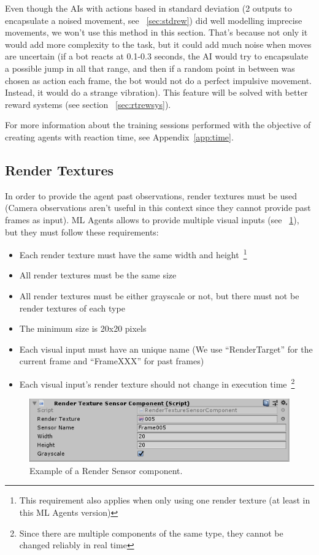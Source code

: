 Even though the AIs with actions based in standard deviation (2 outputs to encapsulate a noised movement, see ~\ref{sec:stdrew}) did well modelling imprecise movements, we won't use this method in this section. That's because not only it would add more complexity to the task, but it could add much noise when moves are uncertain (if a bot reacts at 0.1-0.3 seconds, the AI would try to encapsulate a possible jump in all that range, and then if a random point in between was chosen as action each frame, the bot would not do a perfect impulsive movement. Instead, it would do a strange vibration). This feature will be solved with better reward systems (see section ~\ref{sec:rtrewsys}).

For more information about the training sessions performed with the objective of creating agents with reaction time, see Appendix~\ref{app:time}.

\subsection{Render Textures}

In order to provide the agent past observations, render textures must be used (Camera observations aren't useful in this context since they cannot provide past frames as input). ML Agents allows to provide multiple visual inputs (see ~\ref{fig:rendersens}), but they must follow these requirements:

\begin{itemize}
 \item Each render texture must have the same width and height~\footnote{This requirement also applies when only using one render texture (at least in this ML Agents version)}
 \item All render textures must be the same size
 \item All render textures must be either grayscale or not, but there must not be render textures of each type
 \item The minimum size is 20x20 pixels
 \item Each visual input must have an unique name (We use ``RenderTarget'' for the current frame and ``FrameXXX'' for past frames)
 \item Each visual input's render texture should not change in execution time~\footnote{Since there are multiple components of the same type, they cannot be changed reliably in real time}
\end{itemize}

\begin{figure}[h]
  \centering
		\includegraphics[width=.6\textwidth]{img/rendersensor.png}
  \caption{Example of a Render Sensor component.}
  \label{fig:rendersens}
\end{figure}

